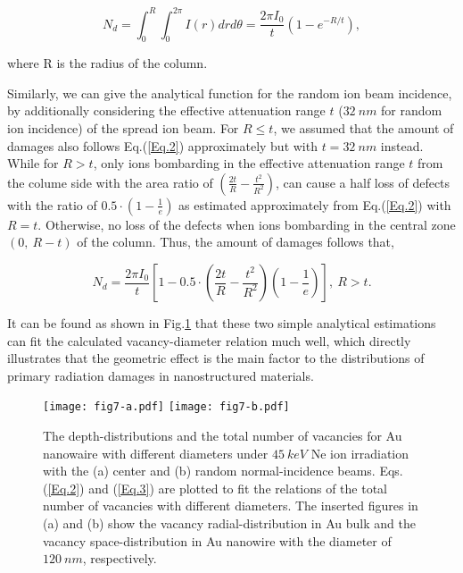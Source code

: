 \begin{equation}
N_d = \int_{0}^{R} \int_{0}^{2\pi} I\left(r\right)drd\theta = \frac{2 \pi I_0}{t} \left(1-e^{-R/t}\right), \label{Eq.2}
\end{equation}

\noindent where R is the radius of the column.

Similarly, we can give the analytical function for the random ion beam incidence, by additionally considering the effective attenuation range $t$ ($32~nm$ for random ion incidence) of the spread ion beam. For $R \leq t$, we assumed that the amount of damages also follows Eq.(\ref{Eq.2}) approximately but with $t=32~nm$ instead. While for $R > t$, only ions bombarding in the effective attenuation range $t$ from the colume side with the area ratio of $\left( \frac{2t}{R} - \frac{t^2}{R^2} \right)$, can cause a half loss of defects with the ratio of $0.5 \cdot \left(1 - \frac{1}{e}\right)$ as estimated approximately from Eq.(\ref{Eq.2}) with $R = t$. Otherwise, no loss of the defects when ions bombarding in the central zone $(0,~R-t)$ of the column. Thus, the amount of damages follows that,

\begin{equation}
N_d = \frac{2 \pi I_0}{t} \left[1 - 0.5 \cdot \left( \frac{2t}{R} - \frac{t^2}{R^2} \right) \left(1 - \frac{1}{e}\right) \right],~ R > t. \label{Eq.3}
\end{equation}

\noindent It can be found as shown in Fig.\ref{Fig.7} that these two simple analytical estimations can fit the calculated vacancy-diameter relation much well, which directly illustrates that the geometric effect is the main factor to the distributions of primary radiation damages in nanostructured materials.

\begin{figure}[!ht]\centering
\texttt{[image: fig7-a.pdf]}
\texttt{[image: fig7-b.pdf]}
\caption{The depth-distributions and the total number of vacancies for Au nanowaire with different diameters under $45~keV$ Ne ion irradiation with the (a) center and (b) random normal-incidence beams. Eqs.(\ref{Eq.2}) and (\ref{Eq.3}) are plotted to fit the relations of the total number of vacancies with different diameters. The inserted figures in (a) and (b) show the vacancy radial-distribution in Au bulk and the vacancy space-distribution in Au nanowire with the diameter of $120~nm$, respectively.} \label{Fig.7}
\end{figure}

